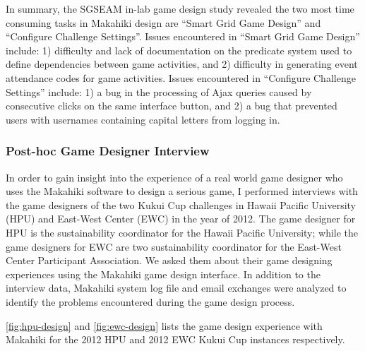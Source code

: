 In summary, the SGSEAM in-lab game design study revealed the two most time consuming tasks in  Makahiki design are ``Smart Grid Game Design'' and ``Configure Challenge Settings''. Issues encountered in ``Smart Grid Game Design'' include: 1) difficulty and lack of documentation on the predicate system used to define dependencies between game activities, and 2) difficulty in generating event attendance codes for game activities. Issues encountered in ``Configure Challenge Settings'' include: 1) a bug in the processing of Ajax queries caused by consecutive clicks on the same interface button, and 2) a bug that prevented users with usernames containing capital letters from logging in.

\subsubsection{Post-hoc Game Designer Interview}
\label{sec:designer-interview-result} 

In order to gain insight into the experience of a real world game designer who uses the Makahiki software to design a serious game, I performed interviews with the game designers of the two Kukui Cup challenges in Hawaii Pacific University (HPU) and East-West Center (EWC) in the year of 2012. The game designer for HPU is the sustainability coordinator for the Hawaii Pacific University; while the game designers for EWC are two sustainability coordinator for the East-West Center Participant Association. We asked them about their game designing experiences using the Makahiki game design interface. In addition to the interview data, Makahiki system log file and email exchanges were analyzed to identify the problems encountered during the game design process.

\autoref{fig:hpu-design} and \autoref{fig:ewc-design} lists the game design experience with Makahiki for the 2012 HPU and 2012 EWC Kukui Cup instances respectively. 

